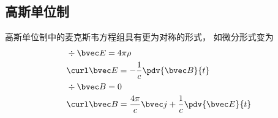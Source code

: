 \subsection{高斯单位制}
高斯单位制中的麦克斯韦方程组具有更为对称的形式， 如微分形式变为
\begin{align}
&\div \bvec E = 4\pi\rho\\
&\curl \bvec E = -\frac{1}{c}\pdv{\bvec B}{t}\\
&\div \bvec B = 0 \\
&\curl \bvec B = \frac{4\pi}{c} \bvec j + \frac{1}{c}\pdv{\bvec E}{t}
\end{align}









